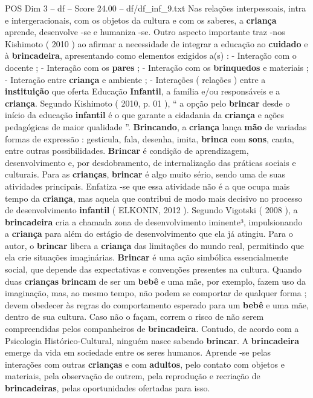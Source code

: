 \begin{textsample}{POS Dim 3 – df – Score 24.00 – df/df\_inf\_9.txt}
Nas relações interpessoais, intra e intergeracionais, com os objetos da cultura e com os saberes, a \textbf{criança} aprende, desenvolve -se e humaniza -se.
Outro aspecto importante traz -nos Kishimoto ( 2010 ) ao afirmar a necessidade de integrar a educação ao \textbf{cuidado} e à \textbf{brincadeira}, apresentando como elementos exigidos a(s) : - Interação com o docente ; - Interação com os \textbf{pares} ; - Interação com os \textbf{brinquedos} e materiais ; - Interação entre \textbf{criança} e ambiente ; - Interações ( relações ) entre a \textbf{instituição} que oferta Educação \textbf{Infantil}, a família e/ou responsáveis e a \textbf{criança}.
Segundo Kishimoto ( 2010, p. 01 ), “ a opção pelo \textbf{brincar} desde o início da educação \textbf{infantil} é o que garante a cidadania da \textbf{criança} e ações pedagógicas de maior qualidade ”. \textbf{Brincando}, a \textbf{criança} lança \textbf{mão} de variadas formas de expressão : gesticula, fala, desenha, imita, \textbf{brinca} com \textbf{sons}, canta, entre outras possibilidades. \textbf{Brincar} é condição de aprendizagem, desenvolvimento e, por desdobramento, de internalização das práticas sociais e culturais.
Para as \textbf{crianças}, \textbf{brincar} é algo muito sério, sendo uma de suas atividades principais.
Enfatiza -se que essa atividade não é a que ocupa mais tempo da \textbf{criança}, mas aquela que contribui de modo mais decisivo no processo de desenvolvimento \textbf{infantil} ( ELKONIN, 2012 ).
Segundo Vigotski ( 2008 ), a \textbf{brincadeira} cria a chamada zona de desenvolvimento iminente³, impulsionando a \textbf{criança} para além do estágio de desenvolvimento que ela já atingiu.
Para o autor, o \textbf{brincar} libera a \textbf{criança} das limitações do mundo real, permitindo que ela crie situações imaginárias. \textbf{Brincar} é uma ação simbólica essencialmente social, que depende das expectativas e convenções presentes na cultura.
Quando duas \textbf{crianças} \textbf{brincam} de ser um \textbf{bebê} e uma mãe, por exemplo, fazem uso da imaginação, mas, ao mesmo tempo, não podem se comportar de qualquer forma ; devem obedecer às regras do comportamento esperado para um \textbf{bebê} e uma mãe, dentro de sua cultura.
Caso não o façam, correm o risco de não serem compreendidas pelos companheiros de \textbf{brincadeira}.
Contudo, de acordo com a Psicologia Histórico-Cultural, ninguém nasce sabendo \textbf{brincar}.
A \textbf{brincadeira} emerge da vida em sociedade entre os seres humanos.
Aprende -se pelas interações com outras \textbf{crianças} e com \textbf{adultos}, pelo contato com objetos e materiais, pela observação de outrem, pela reprodução e recriação de \textbf{brincadeiras}, pelas oportunidades ofertadas para isso.

\end{textsample}
